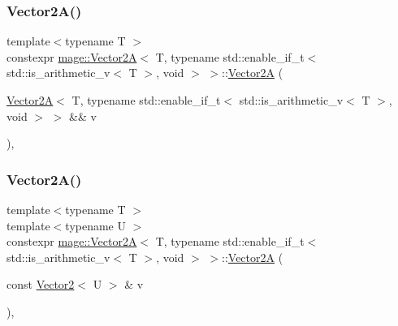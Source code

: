 \subsubsection{\texorpdfstring{Vector2\+A()}{Vector2A()}\hspace{0.1cm}{\footnotesize\ttfamily [5/7]}}
{\footnotesize\ttfamily template$<$typename T $>$ \\
constexpr \hyperlink{structmage_1_1_vector2_a}{mage\+::\+Vector2A}$<$ T, typename std\+::enable\+\_\+if\+\_\+t$<$ std\+::is\+\_\+arithmetic\+\_\+v$<$ T $>$, void $>$ $>$\+::\hyperlink{structmage_1_1_vector2_a}{Vector2A} (\begin{DoxyParamCaption}\item[{\hyperlink{structmage_1_1_vector2_a}{Vector2A}$<$ T, typename std\+::enable\+\_\+if\+\_\+t$<$ std\+::is\+\_\+arithmetic\+\_\+v$<$ T $>$, void $>$ $>$ \&\&}]{v }\end{DoxyParamCaption})\hspace{0.3cm}{\ttfamily [default]}, {\ttfamily [noexcept]}}

\hypertarget{structmage_1_1_vector2_a_3_01_t_00_01typename_01std_1_1enable__if__t_3_01std_1_1is__arithmetic__b421e7a25afc1ac5972d3b452777021a_ae9c48d1037e56808e9d134ead5d47b79}{}\label{structmage_1_1_vector2_a_3_01_t_00_01typename_01std_1_1enable__if__t_3_01std_1_1is__arithmetic__b421e7a25afc1ac5972d3b452777021a_ae9c48d1037e56808e9d134ead5d47b79} 
\subsubsection{\texorpdfstring{Vector2\+A()}{Vector2A()}\hspace{0.1cm}{\footnotesize\ttfamily [6/7]}}
{\footnotesize\ttfamily template$<$typename T $>$ \\
template$<$typename U $>$ \\
constexpr \hyperlink{structmage_1_1_vector2_a}{mage\+::\+Vector2A}$<$ T, typename std\+::enable\+\_\+if\+\_\+t$<$ std\+::is\+\_\+arithmetic\+\_\+v$<$ T $>$, void $>$ $>$\+::\hyperlink{structmage_1_1_vector2_a}{Vector2A} (\begin{DoxyParamCaption}\item[{const \hyperlink{structmage_1_1_vector2}{Vector2}$<$ U $>$ \&}]{v }\end{DoxyParamCaption})\hspace{0.3cm}{\ttfamily [explicit]}, {\ttfamily [noexcept]}}

